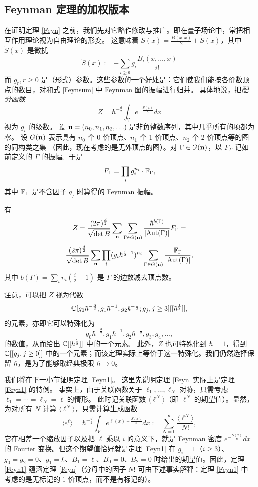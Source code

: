 \subsection{Feynman 定理的加权版本}
在证明定理 \ref{Feyn} 之前，我们先对它略作修改与推广。即在量子场论中，常把相互作用理论视为自由理论的形变。
这意味着 $S(x)=\frac{B(x,x)}{2}+\widetilde S(x)$，其中 $\widetilde S(x)$ 是微扰
$$
\widetilde S(x):=-\sum_{i\ge 0}g_i\frac{B_i(x, \ldots ,x)}{i!}
$$
而 $g_r, r\ge 0$ 是（形式）参数。这些参数的一个好处是：它们使我们能按各价数顶点的数目，对和式 \eqref{Feynsum} 中 Feynman 图的振幅进行归并。
具体地说，把\emph{配分函数}
$$
Z=\hbar^{-\frac{d}{2}}\int_V e^{-\frac{S(x)}{\hbar}}dx
$$
视为 $g_i$ 的级数。
设 $\bold n=(n_0,n_1,n_2, \ldots )$ 是非负整数序列，其中几乎所有的项都为零。
设 $G(\bold n)$ 表示具有 $n_0$ 个 0 价顶点、$n_1$ 个 1 价顶点、$n_2$ 个 2 价顶点等的图的同构类之集
（因此，现在考虑的是无外顶点的图）。对 $\Gamma\in G(\bold n)$，以 $F_\Gamma$ 记如前定义的 $\Gamma$ 的振幅。于是
$$
F_\Gamma=\prod_i{g_i^{n_i}}\cdot \Bbb F_\Gamma, 
$$
其中 $\Bbb F_\Gamma$ 是不含因子 $g_j$ 时算得的 Feynman 振幅。

\begin{theorem}\label{Feyn1}
有
$$
Z=
\frac{(2\pi)^{\frac{d}{2}}}{\sqrt{\det B}}
\sum_{\bold n}
\sum_{\Gamma\in G(\bold n)}\frac{\hbar^{b(\Gamma)}}{|{\rm Aut}(\Gamma)|}
F_\Gamma=
$$
$$
\frac{(2\pi)^{\frac{d}{2}}}{\sqrt{\det B}}
\sum_{\bold n}\prod_i({g_i\hbar^{\frac{i}{2}-1})^{n_i}}
\sum_{\Gamma\in G(\bold n)}\frac{\Bbb F_\Gamma}{|{\rm Aut}(\Gamma)|},
$$
其中 $b(\Gamma)=\sum_i n_i(\frac{i}{2}-1)$
是 $\Gamma$ 的边数减去顶点数。
\end{theorem}

注意，可以把 $Z$ 视为代数
$$
\Bbb C[g_0\hbar^{-\frac{3}{2}},g_1\hbar^{-1},g_2\hbar^{-\frac{1}{2}}; g_j,j\ge 3][[\hbar^{\frac{1}{2}}]],
$$
的元素，亦即它可以特殊化为
$$
g_0\hbar^{-\frac{3}{2}},g_1\hbar^{-1},g_2\hbar^{-\frac{1}{2}},g_3,g_4,...,
$$
的数值，从而给出 $\Bbb C[[\hbar^{\frac{1}{2}}]]$ 中的一个元素。
此外，$Z$ 也可特殊化到 $\hbar=1$，得到 $\Bbb C[[g_j, j\ge 0]]$ 中的一个元素；而该定理实际上等价于这一特殊化。我们仍然选择保留 $\hbar$，是为了能够取经典极限 $\hbar\to 0$。

我们将在下一小节证明定理 \ref{Feyn1}。
这里先说明定理 \ref{Feyn} 实际上是定理 \ref{Feyn1} 的特例。
事实上，由于关联函数关于 $\ell_1, \ldots ,\ell_N$ 对称，只需考虑 $\ell_1= \cdots =\ell_N=\ell$ 的情形。
此时记关联函数 $\langle\ell^N\rangle$（即 $\ell^N$ 的期望值）。显然，为对所有 $N$ 计算 $\langle\ell^N\rangle$，只需计算生成函数
$$
\langle e^{\ell}\rangle=\hbar^{-\frac{d}{2}}\int_Ve^{\ell(x)-\frac{S(x)}{\hbar}}dx:=\sum_{N=0}^\infty \frac{\langle\ell^N\rangle}{N!},
$$
它在相差一个缩放因子以及把 $\ell$ 乘以 $i$ 的意义下，就是 Feynman 密度 $e^{-\frac{S(x)}{\hbar}}dx$ 的 Fourier 变换。但这个期望值恰好就是定理 \ref{Feyn1} 在 $g_i=1$（$i\ge 3$）、$g_0=g_2=0$、$g_1=\hbar $、$B_1=\ell$、$B_0=0$、$B_2=0$ 时给出的期望值。因此，定理 \ref{Feyn1} 蕴涵定理 \ref{Feyn}（分母中的因子 $N!$ 可由下述事实解释：定理 \ref{Feyn1} 中考虑的是无标记的 1 价顶点，而不是有标记的）。

